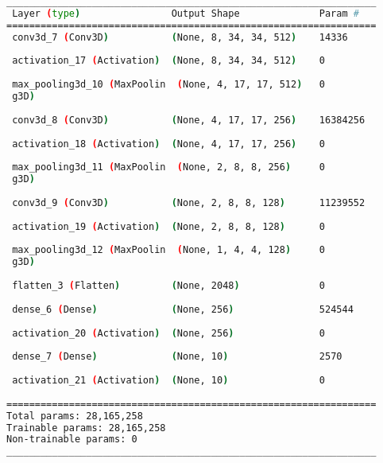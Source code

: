 \begin{lstlisting}[language=Bash,caption={Overview of layers in 3D convolutional network},label={lst:3d_conv_layers},numbers=none]
_________________________________________________________________
 Layer (type)                Output Shape              Param #   
=================================================================
 conv3d_7 (Conv3D)           (None, 8, 34, 34, 512)    14336     
                                                                 
 activation_17 (Activation)  (None, 8, 34, 34, 512)    0         
                                                                 
 max_pooling3d_10 (MaxPoolin  (None, 4, 17, 17, 512)   0         
 g3D)                                                            
                                                                 
 conv3d_8 (Conv3D)           (None, 4, 17, 17, 256)    16384256  
                                                                 
 activation_18 (Activation)  (None, 4, 17, 17, 256)    0         
                                                                 
 max_pooling3d_11 (MaxPoolin  (None, 2, 8, 8, 256)     0         
 g3D)                                                            
                                                                 
 conv3d_9 (Conv3D)           (None, 2, 8, 8, 128)      11239552  
                                                                 
 activation_19 (Activation)  (None, 2, 8, 8, 128)      0         
                                                                 
 max_pooling3d_12 (MaxPoolin  (None, 1, 4, 4, 128)     0         
 g3D)                                                            
                                                                 
 flatten_3 (Flatten)         (None, 2048)              0         
                                                                 
 dense_6 (Dense)             (None, 256)               524544    
                                                                 
 activation_20 (Activation)  (None, 256)               0         
                                                                 
 dense_7 (Dense)             (None, 10)                2570      
                                                                 
 activation_21 (Activation)  (None, 10)                0         
                                                                 
=================================================================
Total params: 28,165,258
Trainable params: 28,165,258
Non-trainable params: 0
_________________________________________________________________
\end{lstlisting}

